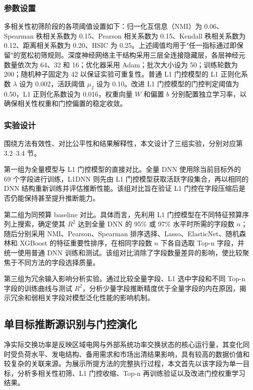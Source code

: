 \documentclass[UTF8,zihao=5,twoside]{ctexart}
\numberwithin{equation}{section}
\begin{document}
\subsubsection{参数设置}
多相关性初筛阶段的各项阈值设置如下：归一化互信息（NMI）为 0.06、Spearman 秩相关系数为 0.15、Pearson 相关系数为 0.15、Kendall 秩相关系数为 0.12、距离相关系数为 0.20、HSIC 为 0.25。上述阈值均用于"任一指标通过即保留"的宽松初筛规则。深度神经网络主干结构采用三层全连接隐藏层，各层神经元数量依次为 64、32 和 16；优化器采用 Adam\cite{ref-kingma-adam}；批次大小设为 50；训练轮数为 200；随机种子固定为 42 以保证实验可重复性。普通 L1 门控模型的 L1 正则化系数 $\lambda$ 设为 0.002，活跃阈值 $\mu_2$ 设为 0.10。改进 L1 门控模型的门控判定阈值为 0.50，L1 正则化系数设为 0.016，权重向量 $W$ 和偏置 $b$ 分别配置独立学习率，以确保相关性权重和门控偏置的稳定收敛。

\subsubsection{实验设计}
围绕方法有效性、对比公平性和结果解释性，本文设计了三组实验，分别对应第 3.2--3.4 节。

第一组为全量模型与 L1 门控模型的直接对比。全量 DNN 使用除当前目标外的 69 个字段进行训练，L1DNN 则先由 L1 门控模型获取活跃字段集合，再以相同的 DNN 结构重新训练并评估推断性能。该组对比旨在验证 L1 门控在字段压缩后是否仍能保持甚至提升推断能力。

第二组为同预算 baseline 对比。具体而言，先利用 L1 门控模型在不同特征预算序列上搜索，确定使其 $R^2$ 达到全量 DNN 的 95\% 或 97\% 水平时所需的字段数 $n$；随后分别采用 NMI、Pearson、Spearman 排序选择、Lasso、ElasticNet、随机森林和 XGBoost 的特征重要性排序，在相同字段数 $n$ 下各自选取 Top-n 字段，并统一使用普通 DNN 训练和测试。该组对比消除了字段数量差异的影响，使比较聚焦于不同方法的字段选择质量。

第三组为冗余输入影响分析实验。通过比较全量字段、L1 选中字段和不同 Top-n 字段的训练曲线与测试 $R^2$，分析少量字段推断精度优于全量字段的内在原因，揭示冗余和弱相关字段对模型泛化性能的影响机制。

\subsection{单目标推断源识别与门控演化}
净实际交换功率是反映区域电网与外部系统功率交换状态的核心运行量，其变化同时受负荷水平、发电结构、备用需求和市场出清结果影响，具有较高的数据价值和较复杂的关联来源。为展示所提方法的完整执行过程，本文首先以该字段为单一目标，分析多相关性初筛、L1 门控收缩、Top-n 再训练验证以及改进门控权重学习结果。
\end{document}
